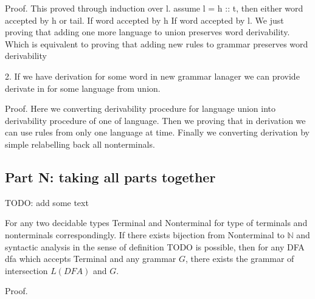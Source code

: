 Proof.
This proved through induction over l.
assume l = h :: t, then either word accepted by h or tail.
If word accepted by h
If word accepted by l. We just proving that adding one more language to union preserves
word derivability. 
Which is equivalent to proving that adding new rules to grammar preserves
word derivability

2. If we have derivation for some word in new grammar lanager we can provide derivate in for some language from union.

Proof.
Here we converting derivability procedure for language union into derivability procedure of one of language.
Then we proving that in derivation we can use rules from only one language at time.
Finally we converting derivation by simple relabelling back all nonterminals.





\subsection{ Part N: taking all parts together}

TODO: add some text


\begin{theorem}
	For any two decidable types Terminal and Nonterminal for type of terminals and nonterminals correspondingly. If there exists bijection from Nonterminal to $\mathbb{N}$ and syntactic analysis in the sense of definition TODO is possible, then for any DFA dfa which accepts Terminal and any grammar $G$, there exists the grammar of intersection $L(DFA)$ and $G$.
\end{theorem}	

Proof. 

